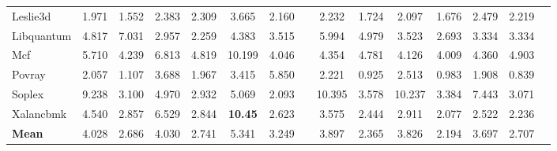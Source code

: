 \begin{table}
{\begin{tabular}{@{}l SSSSSS c@{\hspace{-0.9em}}  SSSSSS c   @{}}
    Leslie3d    &1.971&1.552&2.383&2.309&3.665&2.160 &&2.232&1.724 &2.097&1.676 &2.479&2.219\\ %
    Libquantum  &4.817&7.031&2.957&2.259&4.383&3.515 &&5.994&4.979 &3.523&2.693 &3.334&3.334\\ %
    Mcf         &5.710&4.239&6.813&4.819&10.199&4.046&&4.354&4.781&4.126&4.009 &4.360&4.903\\ %
    Povray      &2.057&1.107&3.688&1.967&3.415&5.850 &&2.221&0.925 &2.513&0.983 &1.908&0.839\\ %
    Soplex      &9.238&3.100&4.970&2.932&5.069&2.093 &&10.395&3.578&10.237&3.384&7.443&3.071\\ %
    Xalancbmk   &4.540&2.857&6.529&2.844&\textbf{10.45}&2.623&&3.575&2.444&2.911&2.077 &2.522&2.236\\ %
    {\bf Mean}  &4.028&2.686&4.030&2.741&5.341&3.249 &&3.897&2.365 &3.826&2.194 &3.697&2.707\\ 
\bottomrule
\end{tabular}
}
\label{tab: Cl--States: PAAE, Standard deviation and Confidence for SPECcpu2006 benchmarks -- Power.}
\end{table}%






